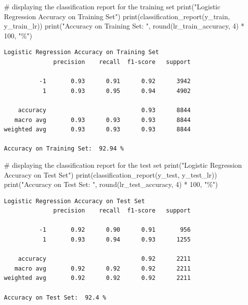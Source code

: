 \documentclass[
  letterpaper,
  DIV=11,
  numbers=noendperiod]{scrartcl}
\newenvironment{Shaded}{\begin{snugshade}}{\end{snugshade}}
\newcommand{\BuiltInTok}[1]{\textcolor[rgb]{0.00,0.23,0.31}{#1}}
\newcommand{\CommentTok}[1]{\textcolor[rgb]{0.37,0.37,0.37}{#1}}
\newcommand{\DecValTok}[1]{\textcolor[rgb]{0.68,0.00,0.00}{#1}}
\newcommand{\NormalTok}[1]{\textcolor[rgb]{0.00,0.23,0.31}{#1}}
\newcommand{\OperatorTok}[1]{\textcolor[rgb]{0.37,0.37,0.37}{#1}}
\newcommand{\StringTok}[1]{\textcolor[rgb]{0.13,0.47,0.30}{#1}}
\begin{document}
\begin{Shaded}
\begin{Highlighting}[]
\CommentTok{\# displaying the classification report for the training set}
\BuiltInTok{print}\NormalTok{(}\StringTok{"Logistic Regression Accuracy on Training Set"}\NormalTok{)}
\BuiltInTok{print}\NormalTok{(classification\_report(y\_train, y\_train\_lr))}
\BuiltInTok{print}\NormalTok{(}\StringTok{"Accuracy on Training Set: "}\NormalTok{, }\BuiltInTok{round}\NormalTok{(lr\_train\_accuracy, }\DecValTok{4}\NormalTok{) }\OperatorTok{*} \DecValTok{100}\NormalTok{, }\StringTok{"\%"}\NormalTok{)}
\end{Highlighting}
\end{Shaded}

\begin{verbatim}
Logistic Regression Accuracy on Training Set
              precision    recall  f1-score   support

          -1       0.93      0.91      0.92      3942
           1       0.93      0.95      0.94      4902

    accuracy                           0.93      8844
   macro avg       0.93      0.93      0.93      8844
weighted avg       0.93      0.93      0.93      8844

Accuracy on Training Set:  92.94 %
\end{verbatim}

\begin{Shaded}
\begin{Highlighting}[]
\CommentTok{\# displaying the classification report for the test set}
\BuiltInTok{print}\NormalTok{(}\StringTok{"Logistic Regression Accuracy on Test Set"}\NormalTok{)}
\BuiltInTok{print}\NormalTok{(classification\_report(y\_test, y\_test\_lr))}
\BuiltInTok{print}\NormalTok{(}\StringTok{"Accuracy on Test Set: "}\NormalTok{, }\BuiltInTok{round}\NormalTok{(lr\_test\_accuracy, }\DecValTok{4}\NormalTok{) }\OperatorTok{*} \DecValTok{100}\NormalTok{, }\StringTok{"\%"}\NormalTok{)}
\end{Highlighting}
\end{Shaded}

\begin{verbatim}
Logistic Regression Accuracy on Test Set
              precision    recall  f1-score   support

          -1       0.92      0.90      0.91       956
           1       0.93      0.94      0.93      1255

    accuracy                           0.92      2211
   macro avg       0.92      0.92      0.92      2211
weighted avg       0.92      0.92      0.92      2211

Accuracy on Test Set:  92.4 %
\end{verbatim}
\end{document}
